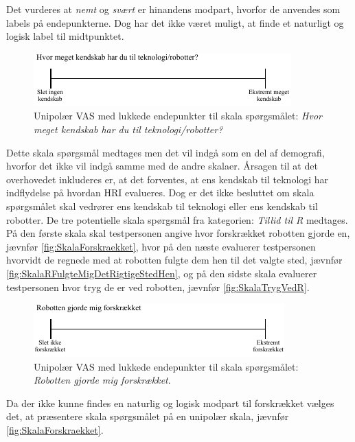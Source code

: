 \noindent
%
Det vurderes at \textit{nemt} og \textit{svært} er hinandens modpart, hvorfor de anvendes som labels på endepunkterne. Dog har det ikke været muligt, at finde et naturligt og logisk label til midtpunktet. 
%
\begin{figure}[H]
\centering
\includegraphics[width =\textwidth]{Figure/UdvalgteSkalaer/KendskabTilTeknologi} 
\caption{Unipolær VAS med lukkede endepunkter til skala spørgsmålet: \textit{Hvor meget kendskab har du til teknologi/robotter?}}
\label{fig:SkalaKendskabTilTeknologi}
\end{figure}
\noindent
%
Dette skala spørgsmål medtages men det vil indgå som en del af demografi, hvorfor det ikke vil indgå samme med de andre skalaer. Årsagen til at det overhovedet inkluderes er, at det forventes, at ens kendskab til teknologi har indflydelse på hvordan HRI evalueres. Dog er det ikke besluttet om skala spørgsmålet skal vedrører ens kendskab til teknologi eller ens kendskab til robotter. \blankline 
%
De tre potentielle skala spørgsmål fra kategorien: \textit{Tillid til R} medtages. På den første skala skal testpersonen angive hvor forskrækket robotten gjorde en, jævnfør \autoref{fig:SkalaForskraekket}, hvor på den næste evaluerer testpersonen hvorvidt de regnede med at robotten fulgte dem hen til det valgte sted, jævnfør \autoref{fig:SkalaRFulgteMigDetRigtigeStedHen}, og på den sidste skala evaluerer testpersonen hvor tryg de er ved robotten, jævnfør \autoref{fig:SkalaTrygVedR}.
%
\begin{figure}[H]
\centering
\includegraphics[width =\textwidth]{Figure/UdvalgteSkalaer/Forskraekket} 
\caption{Unipolær VAS med lukkede endepunkter til skala spørgsmålet: \textit{Robotten gjorde mig forskrækket}.}
\label{fig:SkalaForskraekket}
\end{figure}
\noindent
%
Da der ikke kunne findes en naturlig og logisk modpart til forskrækket vælges det, at præsentere skala spørgsmålet på en unipolær skala, jævnfør \autoref{fig:SkalaForskraekket}. 
